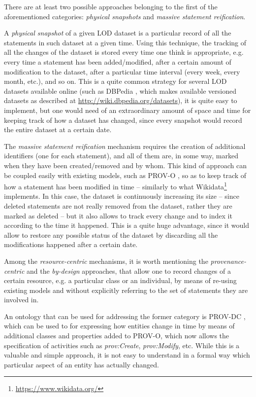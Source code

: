 \documentclass[runningheads,a4paper]{llncs}
\begin{document}
There are at least two possible approaches belonging to the first of the aforementioned categories: {\em physical snapshots} and {\em massive statement reification}.

A {\em physical snapshot} of a given LOD dataset is a particular record of all the statements in such dataset at a given time. Using this technique, the tracking of all the changes of the dataset is stored every time one think is appropriate, e.g. every time a statement has been added/modified, after a certain amount of modification to the dataset, after a particular time interval (every week, every month, etc.), and so on. This is a quite common strategy for several LOD datasets available online (such as DBPedia  \cite{__RefNumPara__17502_1591320820}, which makes available versioned datasets as described at \url{http://wiki.dbpedia.org/datasets}), it is quite easy to implement, but one would need of an extraordinary amount of space and time for keeping track of how a dataset has changed, since every snapshot would record the entire dataset at a certain date.

The {\em massive statement reification} mechanism requires the creation of additional identifiers (one for each statement), and all of them are, in some way, marked when they have been created/removed and by whom. This kind of approach can be coupled easily with existing models, such as PROV-O  \cite{__RefNumPara__17349_1591320820}, so as to keep track of how a statement has been modified in time -- similarly to what Wikidata\footnote{\url{https://www.wikidata.org/}} \cite{__RefNumPara__17504_1591320820} implements. In this case, the dataset is continuously increasing its size -- since deleted statements are not really removed from the dataset, rather they are marked as deleted -- but it also allows to track every change and to index it according to the time it happened. This is a quite huge advantage, since it would allow to restore any possible status of the dataset by discarding all the modifications happened after a certain date.

Among the {\em resource-centric} mechanisms, it is worth mentioning the {\em provenance-centric} and the {\em by-design} approaches, that allow one to record changes of a certain resource, e.g. a particular class or an individual, by means of re-using existing models and without explicitly referring to the set of statements they are involved in. 

An ontology that can be used for addressing the former category is PROV-DC  \cite{__RefNumPara__17595_1591320820}, which can be used to for expressing how entities change in time by means of additional classes and properties added to PROV-O, which now allows the specification of activities such as {\em prov:Create}, {\em prov:Modify}, etc. While this is a valuable and simple approach, it is not easy to understand in a formal way which particular aspect of an entity has actually changed.
\end{document}

